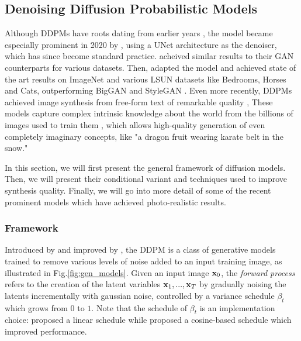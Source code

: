 \subsection{Denoising Diffusion Probabilistic Models}\label{sec:diffusion:models}

Although \ac{DDPM}s have roots dating from earlier years \citep{sohl2015deep}, the model became 
especially prominent in 2020 by \cite{ho2020denoising}, using a UNet architecture 
as the denoiser, which has since become standard practice. \cite{ho2020denoising} acheived 
similar results to their 
\ac{GAN} counterparts for various datasets. Then, \cite{dhariwal2021diffusion} adapted 
the model and achieved state of the art results on ImageNet and various LSUN datasets like 
Bedrooms, Horses and Cats, outperforming BigGAN \citep{brock2018large} and StyleGAN \citep{karra2020stylegan2}. 
Even more recently, \ac{DDPM}s achieved image synthesis from free-form text of remarkable quality \citep{ramesh2022hierarchical, nichol2021glide, saharia2022photorealistic, gafni2022make, rombach2022high}, 
These models capture complex intrinsic knowledge about the world from the billions of images used to train them \citep{schuhmann2022laion}, which 
allows high-quality generation of even completely imaginary concepts, like "a dragon fruit wearing karate belt in the snow."

In this section, we will first present the general framework of diffusion models. Then, we will 
present their conditional variant and techniques used to improve synthesis quality. Finally, 
we will go into more detail of some of the recent prominent models which have achieved photo-realistic 
results.

\subsubsection{Framework}\label{subsec:diffusionmodels_framework}

Introduced by \cite{sohl2015deep} and improved by \cite{ho2020denoising}, the \ac{DDPM} is a class 
of generative models trained to remove various levels of noise added to an input training image, as illustrated in Fig.\ref{fig:gen_models}.
Given an input image $\mathbf{x}_0$, the \emph{forward process} refers to the creation of the latent variables 
$\mathbf{x}_1, ..., \mathbf{x}_T$ by gradually noising the latents incrementally with gaussian noise, controlled by 
a variance schedule ${\beta_t}$ which grows from $0$ to $1$. Note that the schedule of 
$\beta_t$ is an implementation choice: \cite{ho2020denoising} proposed a linear schedule while 
\cite{dhariwal2021diffusion} proposed a cosine-based schedule which improved performance.

